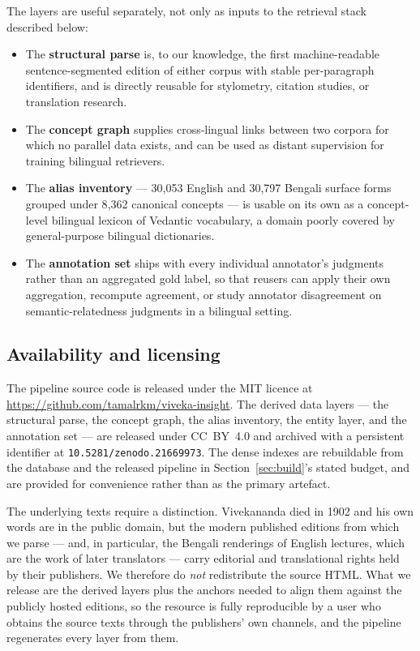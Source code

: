 \documentclass[pdflatex,sn-mathphys-num]{sn-jnl}
\begin{document}
The layers are useful separately, not only as inputs to the retrieval
stack described below:

\begin{itemize}[leftmargin=1.4em]
  \item The \textbf{structural parse} is, to our knowledge, the first
  machine-readable sentence-segmented edition of either corpus with
  stable per-paragraph identifiers, and is directly reusable for
  stylometry, citation studies, or translation research.
  \item The \textbf{concept graph} supplies cross-lingual links between
  two corpora for which no parallel data exists, and can be used as
  distant supervision for training bilingual retrievers.
  \item The \textbf{alias inventory} --- 30{,}053 English and 30{,}797
  Bengali surface forms grouped under 8{,}362 canonical concepts --- is
  usable on its own as a concept-level bilingual lexicon of Vedantic
  vocabulary, a domain poorly covered by general-purpose bilingual
  dictionaries.
  \item The \textbf{annotation set} ships with every individual
  annotator's judgments rather than an aggregated gold label, so that
  reusers can apply their own aggregation, recompute agreement, or study
  annotator disagreement on semantic-relatedness judgments in a
  bilingual setting.
\end{itemize}

\subsection{Availability and licensing}
\label{sec:availability}

The pipeline source code is released under the MIT licence at
\url{https://github.com/tamalrkm/viveka-insight}. The derived data layers --- the structural parse,
the concept graph, the alias inventory, the entity layer, and the
annotation set --- are released under CC~BY~4.0 and archived with a
persistent identifier at \texttt{10.5281/zenodo.21669973}. The dense indexes are
rebuildable from the database and the released pipeline in
Section~\ref{sec:build}'s stated budget, and are provided for convenience
rather than as the primary artefact.

The underlying texts require a distinction. Vivekananda died in 1902 and
his own words are in the public domain, but the modern published editions
from which we parse --- and, in particular, the Bengali renderings of
English lectures, which are the work of later translators --- carry
editorial and translational rights held by their publishers. We therefore
do \emph{not} redistribute the source HTML. What we release are the
derived layers plus the anchors needed to align them against the publicly
hosted editions, so the resource is fully reproducible by a user who
obtains the source texts through the publishers' own channels, and the
pipeline regenerates every layer from them.
\end{document}
